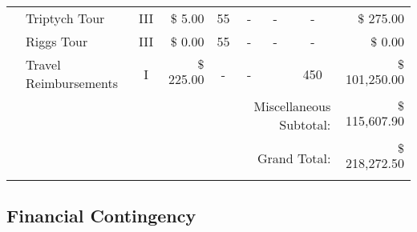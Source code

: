 \begin{table}[H]
{\begin{tabular}{|clcrccccr|}
     & Triptych Tour             & III                       & $\$$ 5.00                 & 55                        &     -                    &     -                     &     -                     & $\$$ 275.00               \\
     & Riggs Tour                & III                       & $\$$ 0.00                 & 55                        &     -                    &     -                     &     -                     & $\$$ 0.00                 \\
     & Travel Reimbursements     & I                         & $\$$ 225.00               &  -                        &     -                    &                           &  450                      & $\$$ 101,250.00           \\ \hline
     &                           &                           &                           &                           &\multicolumn{3}{r}{Miscellaneous Subtotal:}                                       & $\$$ 115,607.90           \\ \hline\hline
     &                           &                           &                           &                           &                          &                           &                           &                           \\
     &                           &                           &                           &                           &\multicolumn{3}{r}{Grand Total:}                                                  & $\$$218,272.50            \\
     &                           &                           &                           &                           &                          &                           &                           &                           \\ \hline
\end{tabular}}
\end{table}

\subsection{Financial Contingency}


\begin{table}[H]
    \caption{Budget Cuts}
    \label{table:cuts}
    \centering
\end{table}

